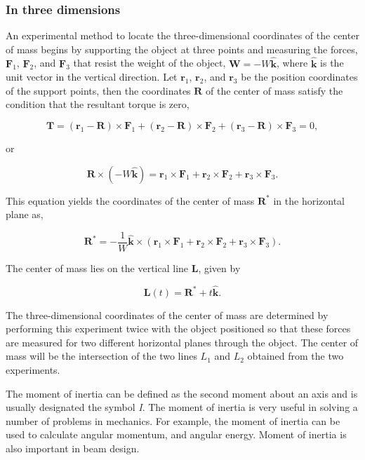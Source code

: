 \subsubsection{In three dimensions}
\label{sss:inth-92e6}


An experimental method to locate the three-dimensional coordinates of the center of mass begins by supporting the object at three points and measuring the forces, $\mathbf{F} _1$, $\mathbf{F} _2$, and $\mathbf{F} _3$ that resist the weight of the object, $\mathbf{W} = -W\mathbf{\hat{k}}$, where $\mathbf{\hat{k}}$ is the unit vector in the vertical direction. Let $\mathbf{r} _1$, $\mathbf{r} _2$, and $\mathbf{r} _3$ be the position coordinates of the support points, then the coordinates $\mathbf{R}$ of the center of mass satisfy the condition that the resultant torque is zero,


\[
\mathbf{T} = (\mathbf{r} _1 - \mathbf{R}) \times \mathbf{F} _1 + (\mathbf{r} _2 - \mathbf{R}) \times \mathbf{F} _2 + (\mathbf{r} _3 - \mathbf{R}) \times \mathbf{F} _3 = 0,
\]

or


\[
\mathbf{R} \times \left(-W\mathbf{\hat{k}}\right) = \mathbf{r} _1 \times \mathbf{F} _1 + \mathbf{r} _2 \times \mathbf{F} _2 + \mathbf{r} _3 \times \mathbf{F} _3.
\]


This equation yields the coordinates of the center of mass $\mathbf{R} ^{*}$ in the horizontal plane as,


\[
\mathbf{R}^{*} = -\frac{1}{W} \mathbf{\hat{k}} \times (\mathbf{r} _1 \times \mathbf{F} _1 + \mathbf{r} _2 \times\mathbf{F} _2 + \mathbf{r} _3 \times \mathbf{F} _3).
\]


The center of mass lies on the vertical line $\mathbf{L}$, given by


\[
\mathbf{L}(t) = \mathbf{R}^* + t\mathbf{\hat{k}}.
\]


The three-dimensional coordinates of the center of mass are determined by performing this experiment twice with the object positioned so that these forces are measured for two different horizontal planes through the object. The center of mass will be the intersection of the two lines $L_1$ and $L_2$ obtained from the two experiments.


The moment of inertia can be defined as the second moment about an axis and is usually designated the symbol \textit{I}. The moment of inertia is very useful in solving a number of problems in mechanics. For example, the moment of inertia can be used to calculate angular momentum, and angular energy. Moment of inertia is also important in beam design.


